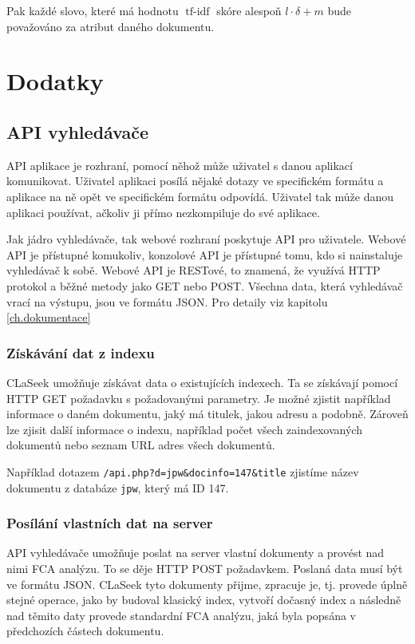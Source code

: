 \documentclass[12pt]{article}
\newcommand{\name}{CLaSeek}
\newcommand{\code}[1]{\texttt{#1}}
\newcommand{\ssection}[1]{\subsection{#1}}
\newcommand{\sssection}[1]{\subsubsection{#1}}
\DeclareMathOperator{\tfidf}{tf-idf}
\begin{document}
Pak každé slovo, které má hodnotu $\tfidf$ skóre alespoň $l\cdot\delta+m$ bude považováno za atribut daného dokumentu. 











\newpage
\section{Dodatky}

\ssection{API vyhledávače}

API aplikace je rozhraní, pomocí něhož může uživatel s danou aplikací komunikovat. Uživatel aplikaci posílá nějaké dotazy ve specifickém formátu a aplikace na ně opět ve specifickém formátu odpovídá. Uživatel tak může danou aplikaci používat, ačkoliv ji přímo nezkompiluje do své aplikace.  

Jak jádro vyhledávače, tak webové rozhraní poskytuje API pro uživatele. Webové API je přístupné komukoliv, konzolové API je přístupné tomu, kdo si nainstaluje vyhledávač k sobě. Webové API je RESTové, to znamená, že využívá HTTP protokol a běžné metody jako GET nebo POST. Všechna data, která vyhledávač vrací na výstupu, jsou ve formátu JSON. Pro detaily viz kapitolu \ref{ch.dokumentace}

\sssection{Získávání dat z indexu}

\name{} umožňuje získávat data o existujících indexech. Ta se získávají pomocí HTTP GET požadavku s požadovanými parametry. Je možné zjistit například informace o daném dokumentu, jaký má titulek, jakou adresu a podobně. Zároveň lze zjisit další informace o indexu, například počet všech zaindexovaných dokumentů nebo seznam URL adres všech dokumentů.

Například dotazem \code{/api.php?d=jpw\&docinfo=147\&title} zjistíme název dokumentu z databáze \code{jpw}, který má ID 147.

\sssection{Posílání vlastních dat na server}\label{ch.apipost}
API vyhledávače umožňuje poslat na server vlastní dokumenty a provést nad nimi FCA analýzu. To se děje HTTP POST požadavkem. Poslaná data musí být ve formátu JSON. \name{} tyto dokumenty přijme, zpracuje je, tj. provede úplně stejné operace, jako by budoval klasický index, vytvoří dočasný index a následně nad těmito daty provede standardní FCA analýzu, jaká byla popsána v předchozích částech dokumentu. 
\end{document}
